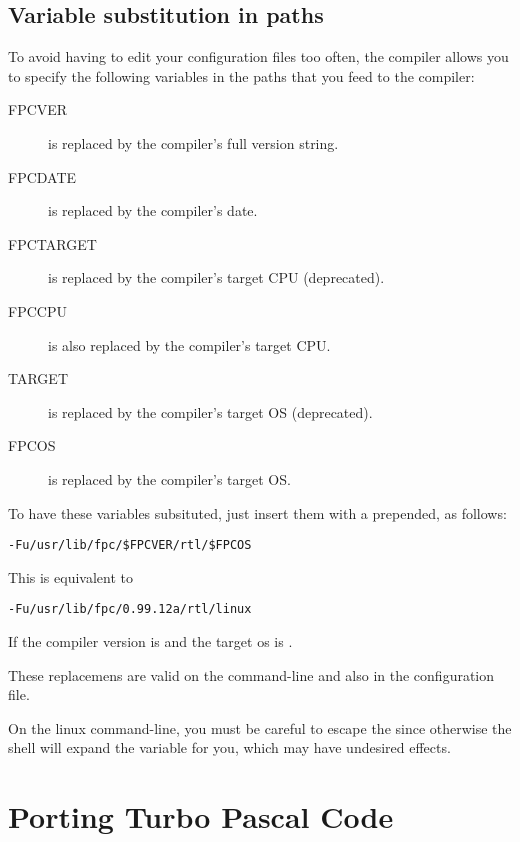\section{Variable substitution in paths}
To avoid having to edit your configuration files too often,
the compiler allows you to specify the following variables in
the paths that you feed to the compiler:
\begin{description}
\item[FPCVER] is replaced by the compiler's full version string.
\item[FPCDATE] is replaced by the compiler's date.
\item[FPCTARGET] is replaced by the compiler's target CPU
(deprecated).
\item[FPCCPU] is also replaced by the compiler's target CPU.
\item[TARGET] is replaced by the compiler's target OS (deprecated).
\item[FPCOS] is replaced by the compiler's target OS.
\end{description}
To have these variables subsituted, just insert them with a \var{\$}
prepended, as follows:
\begin{verbatim}
-Fu/usr/lib/fpc/$FPCVER/rtl/$FPCOS
\end{verbatim}
This is equivalent to
\begin{verbatim}
-Fu/usr/lib/fpc/0.99.12a/rtl/linux
\end{verbatim}
If the compiler version is  and the target os is .

These replacemens are valid on the command-line and also in the
configuration file.

On the linux command-line, you must be careful to escape the \var{\$} since
otherwise the shell will expand the variable for you, which may have
undesired effects.





\chapter{Porting Turbo Pascal Code}

